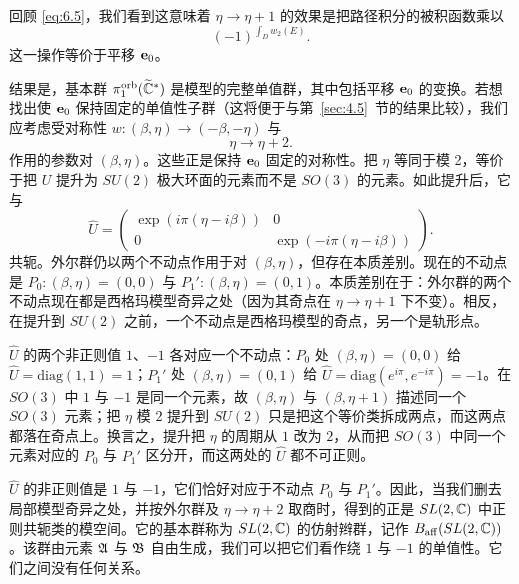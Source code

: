回顾 \eqref{eq:6.5}，我们看到这意味着 $\eta\to \eta+1$ 的效果是把路径积分的被积函数乘以
\setcounter{equation}{11}
\begin{equation}\label{eq:6.12}
  (-1)^{\int_Dw_2(E)}.
\end{equation}
这一操作等价于平移 ${\bf e}_0$。

结果是，基本群 $\pi_1^{\rm orb}(\widetilde{{\mathbb{C}}}^*)$ 是模型的完整单值群，其中包括平移 ${\bf e}_0$ 的变换。若想找出使 ${\bf e}_0$ 保持固定的单值性子群（这将便于与第~\ref{sec:4.5}~节的结果比较），我们应考虑受对称性 $w:(\beta,\eta)\to (-\beta,-\eta)$ 与
\setcounter{equation}{12}
\begin{equation}\label{eq:6.13}
  \eta\to\eta+2.
\end{equation}
作用的参数对 $(\beta,\eta)$。这些正是保持 ${\bf e}_0$ 固定的对称性。把 $\eta$ 等同于模 2，等价于把 $U$ 提升为 $SU(2)$ 极大环面的元素而不是 $SO(3)$ 的元素。如此提升后，它与
\setcounter{equation}{13}
\begin{equation}\label{eq:6.14}
  \hat U=\left(\begin{matrix}\exp({i\pi}(\eta-i\beta))& 0\\ 0&\exp(-{i\pi}(\eta-i\beta))
\end{matrix}\right).
\end{equation}
共轭。外尔群仍以两个不动点作用于对 $(\beta,\eta)$，但存在本质差别。现在的不动点是 $P_0:(\beta,\eta)=(0,0)$ 与 $P_1':(\beta,\eta)=(0,1)$。本质差别在于：外尔群的两个不动点现在都是西格玛模型奇异之处（因为其奇点在 $\eta\to\eta+1$ 下不变）。相反，在提升到 $SU(2)$ 之前，一个不动点是西格玛模型的奇点，另一个是轨形点。

\begin{yizhu}[易错点]$\hat U$ 的两个非正则值 $1$、$-1$ 各对应一个不动点：$P_0$ 处 $(\beta,\eta)=(0,0)$ 给 $\hat U=\mathrm{diag}(1,1)=1$；$P_1'$ 处 $(\beta,\eta)=(0,1)$ 给 $\hat U=\mathrm{diag}(e^{i\pi},e^{-i\pi})=-1$。在 $SO(3)$ 中 $1$ 与 $-1$ 是同一个元素，故 $(\beta,\eta)$ 与 $(\beta,\eta+1)$ 描述同一个 $SO(3)$ 元素；把 $\eta$ 模 $2$ 提升到 $SU(2)$ 只是把这个等价类拆成两点，而这两点都落在奇点上。换言之，提升把 $\eta$ 的周期从 $1$ 改为 $2$，从而把 $SO(3)$ 中同一个元素对应的 $P_0$ 与 $P_1'$ 区分开，而这两处的 $\hat U$ 都不可正则。\end{yizhu}


$\hat U$ 的非正则值是 $1$ 与 $-1$，它们恰好对应于不动点 $P_0$ 与 $P_1'$。因此，当我们删去局部模型奇异之处，并按外尔群及 $\eta\to\eta+2$ 取商时，得到的正是 $SL(2,{\mathbb{C}})$ 中正则共轭类的模空间。它的基本群称为 $SL(2,{\mathbb{C}})$ 的仿射辫群，记作 $B_{\rm aff}(SL(2,{\mathbb{C}}))$。该群由元素 $\mathfrak{A}$ 与 $\mathfrak{B}$ 自由生成，我们可以把它们看作绕 $1$ 与 $-1$ 的单值性。它们之间没有任何关系。

